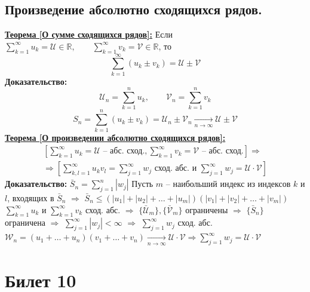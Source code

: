 \documentclass[a4paper,12pt]{article} %
\newcommand{\R}{\mathbb{R}}
\newcommand{\series}{\sum\limits_{k=1}^{\infty}}
\newcommand{\useries}{\sum\limits_{k=1}^{\infty} u_k}
\newcommand{\sn}{\sum\limits_{k=1}^{n} u_k}
\begin{document}
\subsection{Произведение абсолютно сходящихся рядов.}
\underline{\textbf{Теорема [О сумме сходящихся рядов]:}} Если
$\useries = \mathscr{U} \in \R, \hspace{2em} \series v_k = \mathscr{V} \in \R$, то
\[ \series (u_k \pm v_k) = \mathscr{U} \pm \mathscr{V} \]
\textbf{Доказательство:}
\[ \mathscr{U}_n = \sn, \hspace{2em} \mathscr{V}_n = \sum\limits_{k=1}^{n}v_k \]
\[ S_n = \sum\limits_{k=1}^{n}(u_k \pm v_k) = \mathscr{U}_n \pm \mathscr{V}_n \xrightarrow[n \to \infty]{} \mathscr{U} \pm \mathscr{V} \]
\underline{\textbf{Теорема [О произведении абсолютно сходящихся рядов]:}}
\begin{multline*}
	\left[ \useries = \mathscr{U} \text{ -- абс. сход.}, \sum\limits_{k=1}^{\infty}v_k = \mathscr{V} \text{ -- абс. сход.} \right] \Rightarrow \\ \Rightarrow \left[ \sum\limits_{k, l =1}^{\infty}u_k v_l = \sum\limits_{j=1}^{\infty} w_j \text{ сход. абс. и } \sum\limits_{j=1}^{\infty} w_j = \mathscr{U} \cdot \mathscr{V} \right]
\end{multline*}
\textbf{Доказательство:}
$\bar{S}_n = \sum\limits_{j=1}^{n} |w_j|$
Пусть $m$ -- наибольший индекс из индексов $k$ и $l$, входящих в $\bar{S}_n$ $\Rightarrow$ $\bar{S}_n \leqslant (|u_1| + |u_2| + \ldots + |u_m|)(|v_1| + |v_2| + \ldots + |v_m|)$
$\useries$ и $\series v_k$ сход. абс. $\Rightarrow$ $\{ \bar{\mathscr{U}}_m \}, \{ \bar{\mathscr{V}}_m \}$ ограничены $\Rightarrow$ $\{\bar{S}_n\}$ ограничена $\Rightarrow$ $\sum\limits_{j=1}^{\infty} |w_j| < \infty$ $\Rightarrow$ $\sum\limits_{j=1}^{\infty} w_j$ сход. абс.
$\mathscr{W}_n = (u_1 + \ldots + u_n)(v_1 + \ldots + v_n) \xrightarrow[n \to \infty]{} \mathscr{U} \cdot \mathscr{V} \Rightarrow \sum\limits_{j=1}^{\infty} w_j = \mathscr{U} \cdot \mathscr{V}$
\newpage
\section{Билет 10}
\end{document}
